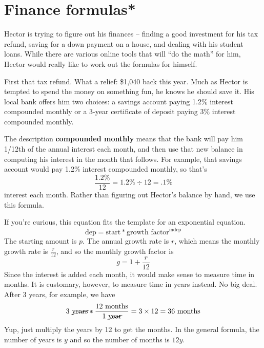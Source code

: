 
\section{Finance formulas*}

Hector is trying to figure out his finances -- finding a good investment for his tax refund, saving for a down payment on a house, and dealing with his student loans.  While there are various online tools that will ``do the math'' for him, Hector would really like to work out the formulas for himself.

First that tax refund.  What a relief:  \$1,040 back this year.  Much as Hector is tempted to spend the money on something fun, he knows he should save it.  His local bank offers him two choices:  a savings account paying 1.2\% interest compounded monthly or a 3-year certificate of deposit paying 3\% interest compounded monthly.  

The description \textbf{compounded monthly} means that the bank will pay him 1/12th of the annual interest each month, and then use that new balance in computing his interest in the month that follows.  For example, that savings account would pay 1.2\% interest compounded monthly, so  that's $$\frac{1.2\%}{12}= 1.2\% \div 12 = .1\%$$ interest each month.  Rather than figuring out Hector's balance by hand, we use this formula.

 \bigskip
\bigskip

If you're curious, this equation fits the template for an exponential equation.  
$$\text{dep} = \text{start} \ast \text{growth factor} ^ {\text{indep}}$$
The starting amount is $p$.  The annual growth rate is $r$, which means the monthly growth rate is $\frac{r}{12}$, and so the monthly growth factor is 
$$g=1+\frac{r}{12}$$ 
Since the interest is added each month, it would make sense to measure time in months.  It is customary, however, to measure time in years instead.  No big deal.  After 3 years, for example, we have 
$$3 \text{ \cancel{years}} \ast \frac{12 \text{ months}}{1\text{ \cancel{year}}} = 3 \times 12 = 36 \text{ months}$$  
Yup, just multiply the years by 12 to get the months.  In the general formula, the number of years is $y$ and so the number of months is $12y$.

